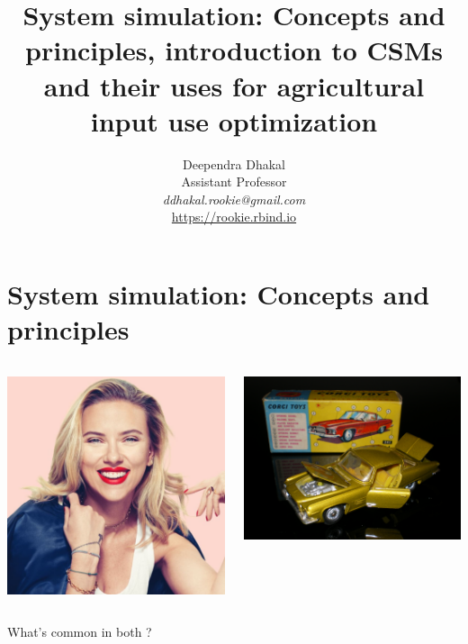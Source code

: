 \documentclass[11pt,dvipsnames,ignorenonframetext,aspectratio=169]{beamer}
\title[]{System simulation: Concepts and principles, introduction to
CSMs and their uses for agricultural input use optimization}
\author[
        Deependra Dhakal\\
Assistant Professor\\
\textit{ddhakal.rookie@gmail.com}\\
\url{https://rookie.rbind.io}
    ]{Deependra Dhakal\\
Assistant Professor\\
\textit{ddhakal.rookie@gmail.com}\\
\url{https://rookie.rbind.io}}
\date[
      
  ]{
    }
\newcommand{\bcolumns}{\begin{columns}[T, onlytextwidth]}
\newcommand{\ecolumns}{\end{columns}}
\begin{document}
  \begin{frame}[plain]
  \titlepage
  \end{frame}



\hypertarget{system-simulation-concepts-and-principles}{%
\section{System simulation: Concepts and
principles}\label{system-simulation-concepts-and-principles}}

\begin{frame}{}
\protect\hypertarget{section}{}
\bcolumns
{}

\includegraphics[width=0.9\linewidth]{../images/model_scarlett-johanson-ftr}


\includegraphics[width=0.8\linewidth]{../images/model_car}

\ecolumns

\centering What's \alert{common} in both ?
\end{frame}
\end{document}
